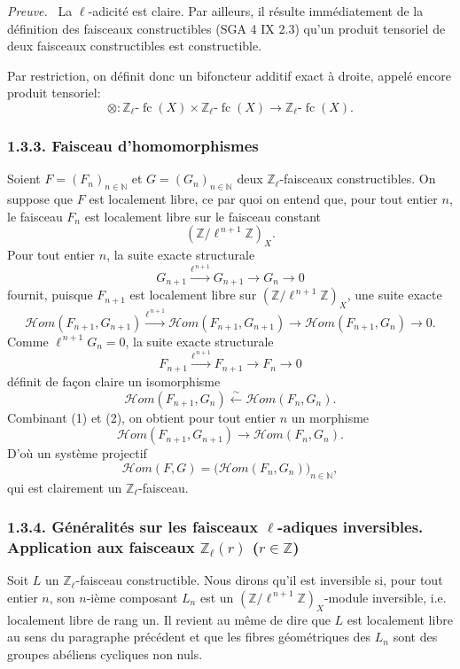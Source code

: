 \documentclass[11pt]{article}
\newenvironment{prooftext}[1][Proof]{\par\noindent\emph{#1.}\ }{\par\medskip}
\providecommand{\cHom}{\mathcal{H}om}
\providecommand{\fc}{\operatorname{fc}}
\begin{document}
\begin{prooftext}[Preuve]
La \(\ell\)-adicité est claire. Par ailleurs, il résulte immédiatement de la définition des faisceaux constructibles (SGA 4 IX 2.3) qu'un produit tensoriel de deux faisceaux constructibles est constructible.
\end{prooftext}

Par restriction, on définit donc un bifoncteur additif exact à droite, appelé encore produit tensoriel:
\[
\otimes:\mathbb Z_\ell\text{-}\fc(X)\times \mathbb Z_\ell\text{-}\fc(X)
\longrightarrow \mathbb Z_\ell\text{-}\fc(X).
\]

\subsubsection*{1.3.3. Faisceau d'homomorphismes}

Soient \(F=(F_n)_{n\in\mathbb N}\) et \(G=(G_n)_{n\in\mathbb N}\) deux \(\mathbb Z_\ell\)-faisceaux constructibles. On suppose que \(F\) est localement libre, ce par quoi on entend que, pour tout entier \(n\), le faisceau \(F_n\) est localement libre sur le faisceau constant
\[
(\mathbb Z/\ell^{\,n+1}\mathbb Z)_X.
\]
Pour tout entier \(n\), la suite exacte structurale
\[
G_{n+1}\xrightarrow{\ell^{\,n+1}}G_{n+1}\longrightarrow G_n\longrightarrow 0
\]
fournit, puisque \(F_{n+1}\) est localement libre sur \((\mathbb Z/\ell^{\,n+1}\mathbb Z)_X\), une suite exacte
\[
\cHom(F_{n+1},G_{n+1})
 \xrightarrow{\ell^{\,n+1}}
\cHom(F_{n+1},G_{n+1})
 \longrightarrow
\cHom(F_{n+1},G_n)
 \longrightarrow 0.
\tag{1}
\]
Comme \(\ell^{\,n+1}G_n=0\), la suite exacte structurale
\[
F_{n+1}\xrightarrow{\ell^{\,n+1}}F_{n+1}\longrightarrow F_n\longrightarrow 0
\]
définit de façon claire un isomorphisme
\[
\cHom(F_{n+1},G_n)\xleftarrow{\sim}\cHom(F_n,G_n).
\tag{2}
\]
Combinant (1) et (2), on obtient pour tout entier \(n\) un morphisme
\[
\cHom(F_{n+1},G_{n+1})\longrightarrow \cHom(F_n,G_n).
\]
D'où un système projectif
\[
\cHom(F,G)=\bigl(\cHom(F_n,G_n)\bigr)_{n\in\mathbb N},
\]
qui est clairement un \(\mathbb Z_\ell\)-faisceau.

\subsubsection*{1.3.4. Généralités sur les faisceaux \(\ell\)-adiques inversibles. Application aux faisceaux \(\mathbb Z_\ell(r)\) (\(r\in\mathbb Z\))}

Soit \(L\) un \(\mathbb Z_\ell\)-faisceau constructible. Nous dirons qu'il est inversible si, pour tout entier \(n\), son \(n\)-ième composant \(L_n\) est un \((\mathbb Z/\ell^{\,n+1}\mathbb Z)_X\)-module inversible, i.e. localement libre de rang un. Il revient au même de dire que \(L\) est localement libre au sens du paragraphe précédent et que les fibres géométriques des \(L_n\) sont des groupes abéliens cycliques non nuls.
\end{document}
